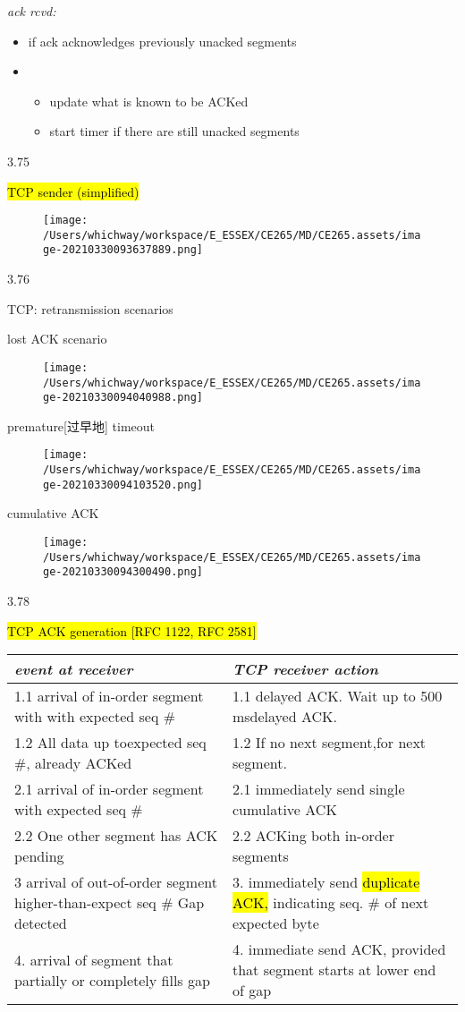 \documentclass[
]{article}
\begin{document}
\emph{ack rcvd:}

\begin{itemize}
\item
  if ack acknowledges previously unacked segments
\item
  \begin{itemize}
  \item
    update what is known to be ACKed
  \item
    start timer if there are still unacked segments
  \end{itemize}
\end{itemize}

3.75

\hl{TCP sender (simplified)}

\begin{figure}
\centering
\texttt{[image: /Users/whichway/workspace/E\_ESSEX/CE265/MD/CE265.assets/image-20210330093637889.png]}
\caption{}
\end{figure}

3.76

TCP: retransmission scenarios

lost ACK scenario

\begin{figure}
\centering
\texttt{[image: /Users/whichway/workspace/E\_ESSEX/CE265/MD/CE265.assets/image-20210330094040988.png]}
\caption{}
\end{figure}

premature{[}过早地{]} timeout

\begin{figure}
\centering
\texttt{[image: /Users/whichway/workspace/E\_ESSEX/CE265/MD/CE265.assets/image-20210330094103520.png]}
\caption{}
\end{figure}

cumulative ACK

\begin{figure}
\centering
\texttt{[image: /Users/whichway/workspace/E\_ESSEX/CE265/MD/CE265.assets/image-20210330094300490.png]}
\caption{}
\end{figure}

3.78

\hl{TCP ACK generation {[}RFC 1122, RFC 2581{]}}

\begin{longtable}[]{@{}ll@{}}
\toprule
\emph{event at receiver} & \emph{TCP receiver action}\tabularnewline
\midrule
\endhead
1.1 arrival of in-order segment with with expected seq \# & 1.1 delayed
ACK. Wait up to 500 msdelayed ACK.\tabularnewline
1.2 All data up toexpected seq \#, already ACKed & 1.2 If no next
segment,for next segment.\tabularnewline
2.1 arrival of in-order segment with expected seq \# & 2.1 immediately
send single cumulative ACK\tabularnewline
2.2 One other segment has ACK pending & 2.2 ACKing both in-order
segments\tabularnewline
3 arrival of out-of-order segment higher-than-expect seq \# Gap detected
& 3. immediately send \hl{duplicate ACK,} indicating seq. \# of next
expected byte\tabularnewline
4. arrival of segment that partially or completely fills gap & 4.
immediate send ACK, provided that segment starts at lower end of
gap\tabularnewline
\bottomrule
\end{longtable}
\end{document}

